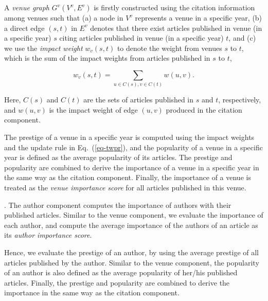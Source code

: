 A {\em venue graph} $G^v(V^v, E^v)$ is firstly constructed using the citation information among venues such that (a) a node in $V^v$ represents a venue in a specific year, (b) a direct edge $(s,t)$ in $E^v$ denotes that there exist articles published in venue (in a specific year) $s$ citing articles published in venue (in a specific year) $t$, and (c) we use the {\em impact weight} $w_v(s,t)$ to denote the weight  from venues $s$ to $t$, which is the sum of the impact weights from articles published in $s$ to $t$, \ie

\vspace{-1ex}
\begin{small}
\begin{equation} \label{eq-infl-weights-v}
w_v(s,t)  = \sum_{u\in C(s), v\in C(t)} w(u,v).
\end{equation}
\end{small}
\noindent
Here, $C(s)$ and $C(t)$ are the sets of articles published in $s$ and $t$, respectively, and $w(u,v)$ is the impact weight of edge $(u, v)$ produced in the citation component.

The prestige of a venue in a specific year is computed using the impact weights and the update rule in Eq.~(\ref{eq-twpr}), and the popularity of a venue in a specific year is defined as the average popularity of its articles. The prestige and popularity are combined to derive the importance of a venue in a specific year in the same way as the citation component. Finally, the importance of a venue is treated as the {\em venue importance score} for all articles published in this venue.






.
The author component computes the importance of authors with their published articles.
%
Similar to the venue component, we evaluate the importance of each author, and compute the average importance of the authors of an article as its {\em author importance score}.

Hence, we evaluate the prestige of an author, by using the average prestige of all articles published by the author. Similar to the venue component, the popularity of an author is also defined as the average popularity of her/his published articles. Finally, the prestige and popularity are combined to derive the importance in the same way as the citation component.

